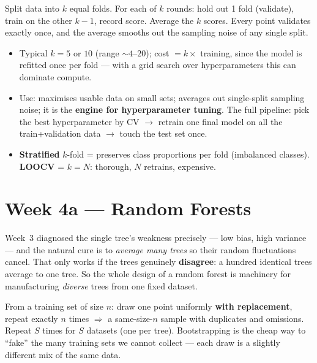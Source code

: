 \documentclass[11pt, a4paper]{article}
\newcommand{\kw}[1]{\textbf{#1}}
\begin{document}
\begin{defbox}
Split data into $k$ equal folds. For each of $k$ rounds: hold out 1 fold (validate), train on the
other $k-1$, record score. Average the $k$ scores. Every point validates exactly once, and the
average smooths out the sampling noise of any single split.
\end{defbox}

\begin{itemize}
  \item Typical $k=5$ or $10$ (range $\sim4$–$20$); cost $=k\times$ training, since the model is
  refitted once per fold — with a grid search over hyperparameters this can dominate compute.
  \item Use: maximises usable data on small sets; averages out single-split sampling noise; it is the
  \kw{engine for hyperparameter tuning}. The full pipeline: pick the best hyperparameter by CV
  $\to$ retrain one final model on all the train+validation data $\to$ touch the test set once.
  \item \kw{Stratified} $k$-fold = preserves class proportions per fold (imbalanced classes).
  \kw{LOOCV} = $k{=}N$: thorough, $N$ retrains, expensive.
\end{itemize}

\section{Week 4a — Random Forests}

Week~3 diagnosed the single tree's weakness precisely — low bias, high variance — and the natural
cure is to \emph{average many trees} so their random fluctuations cancel. That only works if the
trees genuinely \kw{disagree}: a hundred identical trees average to one tree. So the whole design of
a random forest is machinery for manufacturing \emph{diverse} trees from one fixed dataset.

\begin{defbox}
From a training set of size $n$: draw one point uniformly \kw{with replacement}, repeat exactly $n$
times $\Rightarrow$ a same-size-$n$ sample with duplicates and omissions. Repeat $S$ times for $S$
datasets (one per tree). Bootstrapping is the cheap way to ``fake'' the many training sets we cannot
collect — each draw is a slightly different mix of the same data.
\end{defbox}
\end{document}
